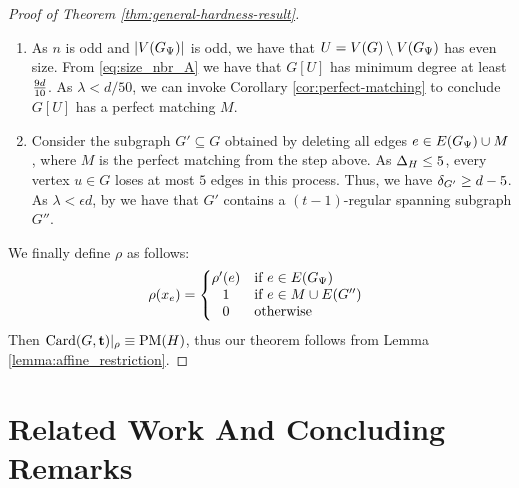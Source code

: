 \documentclass[11pt]{article}
\begin{document}
\begin{proof}[Proof of Theorem \ref{thm:general-hardness-result}]
\begin{enumerate}
\item{ As $n$ is odd and $|V(G_{\Psi})|$ is odd, we have that $U = V(G) \setminus V(G_{\Psi})$ has even size. From \eqref{eq:size_nbr_A} we have that $G[U]$ has minimum degree at least $\frac{9d}{10}$. As $\lambda < d/50$, we can invoke Corollary \ref{cor:perfect-matching} to conclude $G[U]$ has a perfect matching $M$. 
}
  
\item{
  Consider the subgraph $G' \subseteq G$ obtained by deleting all edges $e \in E(G_{\Psi}) \cup M$, where $M$ is the perfect matching from the step above. As $\Delta_{H} \leq 5$, every vertex $u \in G$ loses at most $5$ edges in this process. Thus, we have $\delta_{G'} \ge d - 5$. As $\lambda < \epsilon d$, by  we have that $G'$ contains a $(t-1)$-regular spanning subgraph $G''$. }

\end{enumerate}

We finally define $\rho$ as follows:
\[
\rho(x_e) =
\left\{
\begin{array}{@{}cl}
\rho'(e) & \text{if } e \in \Edges{G_{\EmbeddingFunc}} \\
1 & \text{if } e \in M \cup E(G'') \\
0 & \text{otherwise}
\end{array}
\right.
\]
Then $\text{Card}(G, \mathbf{t})|_\rho \equiv \text{PM}(H)$, thus our theorem follows from Lemma \ref{lemma:affine_restriction}.
\end{proof}


\section{Related Work And Concluding Remarks}
\label{sec:related-work}
\end{document}
